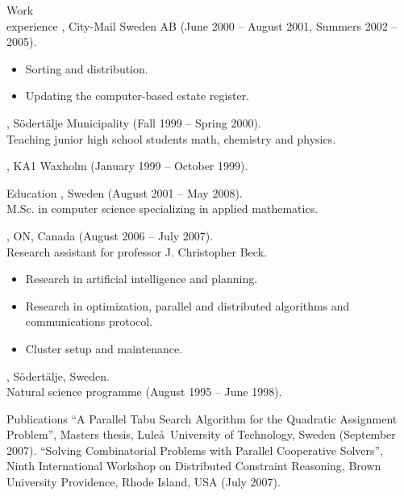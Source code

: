 \documentclass{../../cls/cv}
\begin{document}
\begin{category}{Work \\experience}
, City-Mail Sweden AB (June 2000 -- August 2001, Summers 2002 -- 2005).
\begin{itemize}
   \item Sorting and distribution.
   \item Updating the computer-based estate register.
\end{itemize}

, S\"odert\"alje Municipality (Fall 1999 --
Spring 2000). \\
Teaching junior high school students math, chemistry and physics.

, KA1 Waxholm (January 1999 -- October 1999).
\end{category}

\begin{category}{Education}
, Sweden (August 2001 -- May 2008).\\
M.Sc. in computer science specializing in applied mathematics.

, ON, Canada (August 2006 -- July 2007). \\
Research assistant for professor J. Christopher Beck.
\begin{itemize}
   \item Research in artificial intelligence and planning.
   \item Research in optimization, parallel and distributed algorithms and communications protocol.
   \item Cluster setup and maintenance.
\end{itemize}

, S\"odert\"alje, Sweden.\\
Natural science programme (August 1995 -- June 1998).
\end{category}

\begin{category}{Publications}
\citembullet ``A Parallel Tabu Search Algorithm for the Quadratic Assignment Problem'', Masters thesis, Lule\aa\ University of Technology, Sweden (September 2007).
\citembullet ``Solving Combinatorial Problems with Parallel Cooperative Solvers'', Ninth International
Workshop on Distributed Constraint Reasoning, Brown University Providence, Rhode Island, USA (July 2007).
\end{category}
\end{document}
